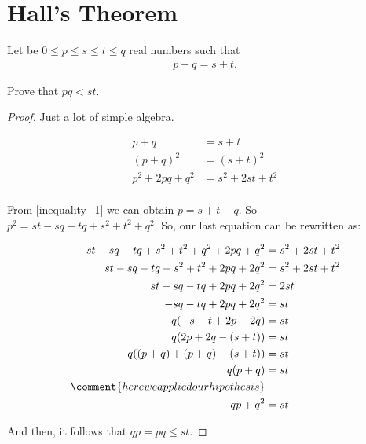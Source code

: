 ﻿\chapter{Hall's Theorem}

    \begin{theorem}
        Let be $0 \leq p \leq s \leq t \leq q$ real numbers such that
        \begin{align}\label{inqeuality_1}
            p + q = s + t.
        \end{align}
        
        Prove that $pq < st$.
    \end{theorem}
    
    \begin{proof}
        Just a lot of simple algebra.
        
        \begin{align}
            p + q               &=      s + t                   \\
            (p + q)^2           &=      (s + t)^2               \\
            p^2 + 2pq + q^2     &=      s^2 + 2st + t^2         \\
        \end{align}
        
        From \eqref{inequality_1} we can obtain $p = s + t - q$. So
        $p^2 = st - sq - tq + s^2 + t^2 + q^2$. So, our last equation can
        be rewritten as:
        
        \begin{align}
            st - sq - tq + s^2 + t^2 + q^2 + 2pq + q^2      &=      s^2 + 2st + t^2         \\         
            st - sq - tq + s^2 + t^2 + 2pq + 2q^2           &=      s^2 + 2st + t^2         \\         
            st - sq - tq + 2pq + 2q^2                       &=      2st                     \\         
            - sq - tq + 2pq + 2q^2                          &=      st                      \\         
            q (- s - t + 2p + 2q)                           &=      st                      \\         
            q (2p + 2q - (s + t))                           &=      st                      \\         
            q ((p + q) + (p + q) - (s + t))                 &=      st                      \\         
            q (p + q)                                       &=      st                      \\
            \comment{here we applied our hipothesis}        &                               \\                    
            qp + q^2                                        &=      st                      \\
        \end{align}
        
        And then, it follows that $qp = pq \leq st$.
    \end{proof}
    
